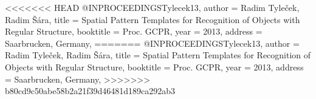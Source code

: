 <<<<<<< HEAD
@INPROCEEDINGS{Tylecek13,
  author = {Radim Tyle{\v c}ek, Radim {\v S}{\' a}ra},
  title = {Spatial Pattern Templates for Recognition of Objects with Regular Structure},
  booktitle = {Proc. GCPR},
  year = {2013},
  address = {Saarbrucken, Germany},
}
=======
@INPROCEEDINGS{Tylecek13,
  author = {Radim Tyle{\v c}ek, Radim {\v S}{\' a}ra},
  title = {Spatial Pattern Templates for Recognition of Objects with Regular Structure},
  booktitle = {Proc. GCPR},
  year = {2013},
  address = {Saarbrucken, Germany},
}
>>>>>>> b80cd9c50abe58b2a21f39d46481d189ca292ab3
